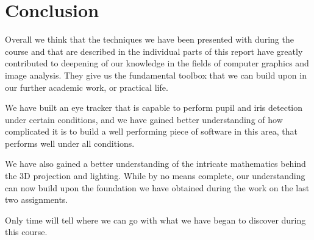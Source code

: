 \pagebreak
\section{Conclusion}

Overall we think that the techniques we have been presented with during the course and that are described in the individual parts of this report have greatly contributed to deepening of our knowledge in the fields of computer graphics and image analysis. They give us the fundamental toolbox that we can build upon in our further academic work, or practical life. 

We have built an eye tracker that is capable to perform pupil and iris detection under certain conditions, and we have gained better understanding of how complicated it is to build a well performing piece of software in this area, that performs well under all conditions.

We have also gained a better understanding of the intricate mathematics behind the 3D projection and lighting. While by no means complete, our understanding can now build upon the foundation we have obtained during the work on the last two assignments.

Only time will tell where we can go with what we have began to discover during this course.